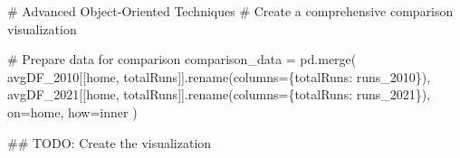 \documentclass[
  letterpaper,
  DIV=11,
  numbers=noendperiod]{scrartcl}
\newenvironment{Shaded}{\begin{snugshade}}{\end{snugshade}}
\newcommand{\AlertTok}[1]{\textcolor[rgb]{0.68,0.00,0.00}{#1}}
\newcommand{\CommentTok}[1]{\textcolor[rgb]{0.37,0.37,0.37}{#1}}
\newcommand{\NormalTok}[1]{\textcolor[rgb]{0.00,0.23,0.31}{#1}}
\newcommand{\OperatorTok}[1]{\textcolor[rgb]{0.37,0.37,0.37}{#1}}
\newcommand{\StringTok}[1]{\textcolor[rgb]{0.13,0.47,0.30}{#1}}
\begin{document}
\label{advanced-oo-techniques}
\begin{Shaded}
\begin{Highlighting}[]
\CommentTok{\# Advanced Object{-}Oriented Techniques}
\CommentTok{\# Create a comprehensive comparison visualization}

\CommentTok{\# Prepare data for comparison}
\NormalTok{comparison\_data }\OperatorTok{=}\NormalTok{ pd.merge(}
\NormalTok{    avgDF\_2010[[}\StringTok{\textquotesingle{}home\textquotesingle{}}\NormalTok{, }\StringTok{\textquotesingle{}totalRuns\textquotesingle{}}\NormalTok{]].rename(columns}\OperatorTok{=}\NormalTok{\{}\StringTok{\textquotesingle{}totalRuns\textquotesingle{}}\NormalTok{: }\StringTok{\textquotesingle{}runs\_2010\textquotesingle{}}\NormalTok{\}),}
\NormalTok{    avgDF\_2021[[}\StringTok{\textquotesingle{}home\textquotesingle{}}\NormalTok{, }\StringTok{\textquotesingle{}totalRuns\textquotesingle{}}\NormalTok{]].rename(columns}\OperatorTok{=}\NormalTok{\{}\StringTok{\textquotesingle{}totalRuns\textquotesingle{}}\NormalTok{: }\StringTok{\textquotesingle{}runs\_2021\textquotesingle{}}\NormalTok{\}),}
\NormalTok{    on}\OperatorTok{=}\StringTok{\textquotesingle{}home\textquotesingle{}}\NormalTok{, how}\OperatorTok{=}\StringTok{\textquotesingle{}inner\textquotesingle{}}
\NormalTok{)}

\CommentTok{\#\# }\AlertTok{TODO}\CommentTok{: Create the visualization}
\end{Highlighting}
\end{Shaded}
\end{document}

